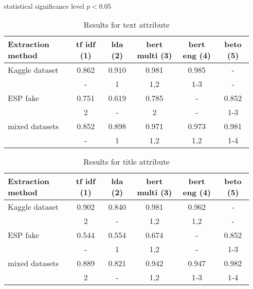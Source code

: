 \documentclass{article}
\begin{document}
statistical significance level $ p < 0.05 $

\begin{table}[]
  \centering
  \caption{Results for text attribute}

  \begin{tabular}{|l|c|c|c|c|c|}
  \hline
  Extraction method & tf idf (1) & lda (2) & bert multi (3)  & bert eng (4) & beto (5)\\
  \hline
  Kaggle dataset     & 0.862         & 0.910           & 0.981        & 0.985        &   - \\
                & \small{-}     & \small{1}       & \small{1,2}  & \small{1-3}  &  \small{-}\\
  \hline
  ESP fake      &  0.751        & 0.619           &  0.785       & -             & 0.852 \\
                & \small{2}     & \small{-}       & \small{2}    & \small{-}     & \small{1-3} \\
  \hline
  mixed datasets & 0.852         & 0.898           & 0.971       & 0.973         & 0.981 \\
                & \small{-}   & \small{1}       & \small{1,2}    & \small{1,2}   & \small{1-4}\\
  \hline

\end{tabular}
  \label{tab:results_text}
\end{table}

\begin{table}[]
  \centering
  \caption{Results for title attribute}

  \begin{tabular}{|l|c|c|c|c|c|}
  \hline
  Extraction method & tf idf (1) & lda (2) & bert multi (3)  & bert eng (4) & beto (5)\\
  \hline
  Kaggle dataset     & 0.902         & 0.840           & 0.981        &0.962        &   - \\
                & \small{2}     &  \small{-}       & \small{1,2}  & \small{1,2}  &  \small{-}\\
  \hline
  ESP fake      &  0.544        &  0.554           &  0.674       & -             & 0.852 \\
                & \small{-}     & \small{1}       & \small{1,2}    & \small{-}     & \small{1-3} \\
  \hline
  mixed datasets & 0.889         & 0.821           & 0.942       & 0.947         &  0.982 \\
                & \small{2}   &  \small{-}       & \small{1,2}    & \small{1-3}   & \small{1-4}\\
  \hline

\end{tabular}
  \label{tab:results_title}
\end{table}
\end{document}
